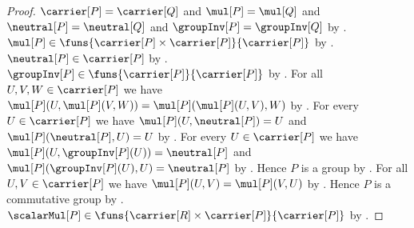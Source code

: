 \begin{proof}
    $\carrier[P]=\carrier[Q]$ and $\mul[P]=\mul[Q]$ and
        $\neutral[P]=\neutral[Q]$ and
        $\groupInv[P]=\groupInv[Q]$ by
        .
    $\mul[P]\in\funs{\carrier[P]\times\carrier[P]}{\carrier[P]}$ by
        .
    $\neutral[P]\in\carrier[P]$ by .
    $\groupInv[P]\in\funs{\carrier[P]}{\carrier[P]}$ by
        .
    For all $U,V,W\in\carrier[P]$ we have
        $\mul[P](U,\mul[P](V,W))=\mul[P](\mul[P](U,V),W)$ by
        .
    For every $U\in\carrier[P]$ we have
        $\mul[P](U,\neutral[P])=U$ and
        $\mul[P](\neutral[P],U)=U$ by
        .
    For every $U\in\carrier[P]$ we have
        $\mul[P](U,\groupInv[P](U))=\neutral[P]$ and
        $\mul[P](\groupInv[P](U),U)=\neutral[P]$ by
        .
    Hence $P$ is a group by
        .
    For all $U,V\in\carrier[P]$ we have
        $\mul[P](U,V)=\mul[P](V,U)$ by \auto.
    Hence $P$ is a commutative group by
        .
    $\scalarMul[P]\in
        \funs{\carrier[R]\times\carrier[P]}{\carrier[P]}$ by
        .


\end{proof}

